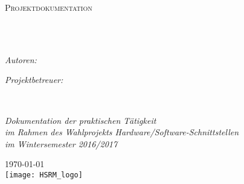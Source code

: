 \documentclass[
11pt, %
oneside, %
ngerman, 
singlespacing, %
parskip, %
headsepline, %
chapterinoneline, %
]{MastersDoctoralThesis} %
\author{Andreas \textsc{Rollbühler},\\ Jens \textsc{Nazarenus},\\ Nils \textsc{Geiselhart}} %
\begin{document}
\frontmatter %

\pagestyle{plain} %


\begin{titlepage}
\begin{center}

\vspace*{.06\textheight}
{\scshape\LARGE \univname\par}\vspace{1.5cm} %
\textsc{\Large Projektdokumentation}\\[0.5cm] %

\HRule \\[0.4cm] %
{\huge \bfseries \ttitle\par}\vspace{0.4cm} %
\HRule \\[1.5cm] %
 
\begin{minipage}[t]{0.4\textwidth}

\begin{flushleft} \large
\emph{Autoren:}\\
\authorname %
\end{flushleft}
\end{minipage}
\begin{minipage}[t]{0.4\textwidth}
\begin{flushright} \large
\emph{Projektbetreuer:} \\
\href{https://www.cs.hs-rm.de/~reith/}{\supname} %
\end{flushright}
\end{minipage}\\[3cm]
 
\vfill

\large \textit{Dokumentation der praktischen Tätigkeit\\ im Rahmen des Wahlprojekts Hardware/Software-Schnittstellen\\ im Wintersemester 2016/2017}
\\[1cm] %
 
\vfill

{\large \today}\\[2cm] %

\texttt{[image: HSRM\_logo]} %
 
\vfill
\end{center}
\end{titlepage}
\end{document}
